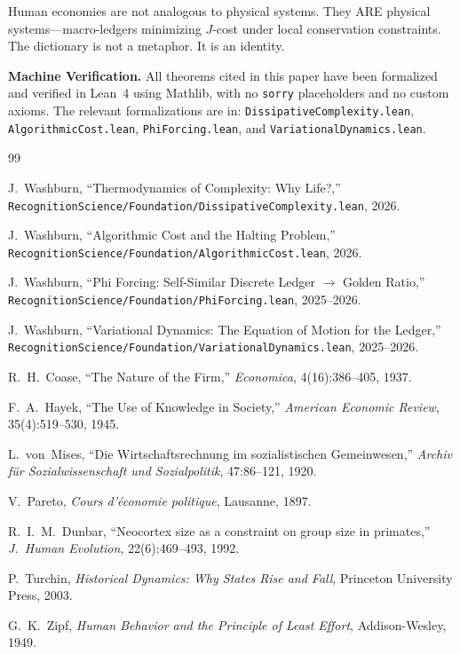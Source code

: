 \documentclass[11pt,a4paper]{article}
\theoremstyle{plain}
\theoremstyle{definition}
\theoremstyle{remark}
\newcommand{\Jcost}{J}
\begin{document}
Human economies are not analogous to physical systems.
They ARE physical systems---macro-ledgers minimizing $\Jcost$-cost under local conservation constraints.
The dictionary is not a metaphor.
It is an identity.

\bigskip

\noindent\textbf{Machine Verification.}\quad
All theorems cited in this paper have been formalized and verified in Lean~4 using Mathlib, with no \texttt{sorry} placeholders and no custom axioms.
The relevant formalizations are in:
\texttt{DissipativeComplexity.lean},
\texttt{AlgorithmicCost.lean},
\texttt{PhiForcing.lean}, and
\texttt{VariationalDynamics.lean}.

\bigskip

\begin{thebibliography}{99}

J.~Washburn, ``Thermodynamics of Complexity: Why Life?,'' \texttt{RecognitionScience/Foundation/DissipativeComplexity.lean}, 2026.

J.~Washburn, ``Algorithmic Cost and the Halting Problem,'' \texttt{RecognitionScience/Foundation/AlgorithmicCost.lean}, 2026.

J.~Washburn, ``Phi Forcing: Self-Similar Discrete Ledger $\to$ Golden Ratio,'' \texttt{RecognitionScience/Foundation/PhiForcing.lean}, 2025--2026.

J.~Washburn, ``Variational Dynamics: The Equation of Motion for the Ledger,'' \texttt{RecognitionScience/Foundation/VariationalDynamics.lean}, 2025--2026.

R.~H.~Coase, ``The Nature of the Firm,'' \emph{Economica}, 4(16):386--405, 1937.

F.~A.~Hayek, ``The Use of Knowledge in Society,'' \emph{American Economic Review}, 35(4):519--530, 1945.

L.~von~Mises, ``Die Wirtschaftsrechnung im sozialistischen Gemeinwesen,'' \emph{Archiv f\"ur Sozialwissenschaft und Sozialpolitik}, 47:86--121, 1920.

V.~Pareto, \emph{Cours d'\'economie politique}, Lausanne, 1897.

R.~I.~M.~Dunbar, ``Neocortex size as a constraint on group size in primates,'' \emph{J.~Human Evolution}, 22(6):469--493, 1992.

P.~Turchin, \emph{Historical Dynamics: Why States Rise and Fall}, Princeton University Press, 2003.

G.~K.~Zipf, \emph{Human Behavior and the Principle of Least Effort}, Addison-Wesley, 1949.

\end{thebibliography}
\end{document}
